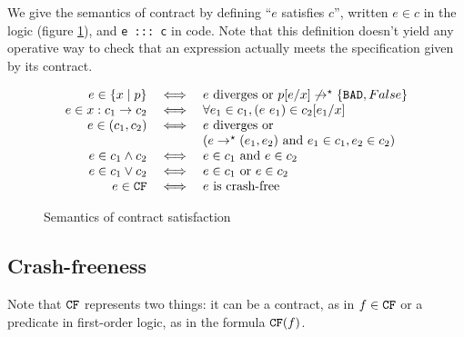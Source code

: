 \documentclass[preprint]{sigplanconf}
\begin{document}
We give the semantics of contract by defining ``$e$ satisfies $c$'',
written $e \in c$ in the logic (figure \ref{cont-smt}), and 
\texttt{e ::: c} in code. Note that this definition
doesn't yield any operative way to check that an expression actually
meets the specification given by its contract.

\begin{figure}[h]
 \centering
  \[  \begin{array}{rcl}
    e \in \{x \mid p \} &\iff& e \mbox{ diverges or } p[e/x] \not \to^\star \{\texttt{BAD},False\}\\
    e \in x:c_1 \to c_2 &\iff& \forall e_1 \in c_1, (e~e_1) \in c_2[e_1/x]\\
    e \in (c_1,c_2) &\iff& e \mbox{ diverges or }\\
    &&  (e \to^\star (e_1,e_2) \mbox{ and } e_1 \in c_1, e_2 \in c_2)\\
    e \in c_1 \land c_2 &\iff& e \in c_1 \mbox{ and } e \in c_2 \\
    e \in c_1 \lor c_2 &\iff& e \in c_1 \mbox{ or } e \in c_2 \\
    e \in \texttt{CF} &\iff& e \mbox{ is crash-free}
  \end{array} \]
   \caption{Semantics of contract satisfaction}

  \label{cont-smt}
\end{figure}

\subsection{Crash-freeness}\label{sec:cf}
Note that $\texttt{CF}$ represents two things: it can be a contract, as in $f
\in \texttt{CF}$ or a predicate in first-order logic, as in the formula $\texttt{CF}(f)$.
\end{document}
